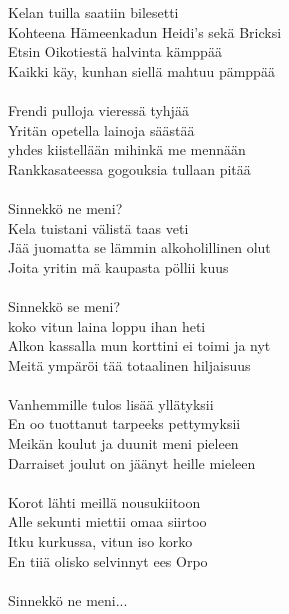 
Kelan tuilla saatiin bilesetti \\
Kohteena Hämeenkadun Heidi’s sekä Bricksi \\ 
Etsin Oikotiestä halvinta kämppää \\
Kaikki käy, kunhan siellä mahtuu pämppää \\
\hspace{10mm} \\
Frendi pulloja vieressä tyhjää \\
Yritän opetella lainoja säästää \\
yhdes kiistellään mihinkä me mennään \\
Rankkasateessa gogouksia tullaan pitää \\
\hspace{10mm} \\
Sinnekkö ne meni? \\
Kela tuistani välistä taas veti \\
Jää juomatta se lämmin alkoholillinen olut \\
Joita yritin mä kaupasta pöllii kuus \\
\hspace{10mm} \\
Sinnekkö se meni? \\
koko vitun laina loppu ihan heti \\
Alkon kassalla mun korttini ei toimi ja nyt \\ 
Meitä ympäröi tää totaalinen hiljaisuus \\
\hspace{10mm} \\
Vanhemmille tulos lisää yllätyksii \\
En oo tuottanut tarpeeks pettymyksii \\
Meikän koulut ja duunit meni pieleen \\
Darraiset joulut on jäänyt heille mieleen \\ 
\hspace{10mm} \\
Korot lähti meillä nousukiitoon \\
Alle sekunti miettii omaa siirtoo \\
Itku kurkussa, vitun iso korko \\
En tiiä olisko selvinnyt ees Orpo \\ 
\hspace{10mm} \\
Sinnekkö ne meni... \\  
